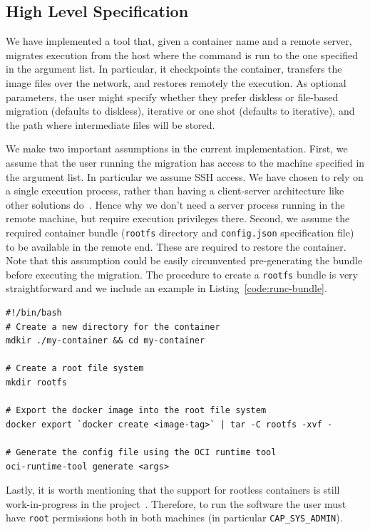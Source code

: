\subsection{High Level Specification}

We have implemented a tool that, given a container name and a remote server, migrates execution from the host where the command is run to the one specified in the argument list.
In particular, it checkpoints the container, transfers the image files over the network, and restores remotely the execution.
As optional parameters, the user might specify whether they prefer diskless or file-based migration (defaults to diskless), iterative or one shot (defaults to iterative), and the path where intermediate files will be stored.

We make two important assumptions in the current implementation.
First, we assume that the user running the migration has access to the machine specified in the argument list.
In particular we assume SSH access.
We have chosen to rely on a single execution process, rather than having a client-server architecture like other solutions do~\cite{criu-phaul}.
Hence why we don't need a server process running in the remote machine, but require execution privileges there.
Second, we assume the required container bundle (\texttt{rootfs} directory and \texttt{config.json} specification file) to be available in the remote end.
These are required to restore the container.
Note that this assumption could be easily circunvented pre-generating the bundle before executing the migration.
The procedure to create a \texttt{rootfs} bundle is very straightforward and we include an example in Listing~\ref{code:runc-bundle}.
\begin{lstlisting}[style=Bash,caption={Commands to generate an OCI bundle to run a container using \runc.\label{code:runc-bundle}}]
#!/bin/bash
# Create a new directory for the container
mdkir ./my-container && cd my-container

# Create a root file system
mkdir rootfs

# Export the docker image into the root file system
docker export `docker create <image-tag>` | tar -C rootfs -xvf -

# Generate the config file using the OCI runtime tool
oci-runtime-tool generate <args>
\end{lstlisting}
Lastly, it is worth mentioning that the support for rootless containers is still work-in-progress in the \criu project~\cite{criu-user-mode}.
Therefore, to run the software the user must have \texttt{root} permissions both in both machines (in particular \texttt{CAP\_SYS\_ADMIN}).

